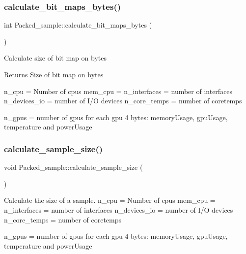 \subsubsection{\texorpdfstring{calculate\+\_\+bit\+\_\+maps\+\_\+bytes()}{calculate\_bit\_maps\_bytes()}}
{\footnotesize\ttfamily int Packed\+\_\+sample\+::calculate\+\_\+bit\+\_\+maps\+\_\+bytes (\begin{DoxyParamCaption}{ }\end{DoxyParamCaption})}

Calculate size of bit map on bytes

\begin{DoxyReturn}{Returns}
Size of bit map on bytes 
\end{DoxyReturn}
n\+\_\+cpu = Number of cpus mem\+\_\+cpu = n\+\_\+interfaces = number of interfaces n\+\_\+devices\+\_\+io = number of I/O devices n\+\_\+core\+\_\+temps = number of coretemps

n\+\_\+gpus = number of gpus for each gpu 4 bytes\+: memory\+Usage, gpu\+Usage, temperature and power\+Usage\mbox{\label{classPacked__sample_a3f941028cbd26a98a99cd3c000b08666}} 
\subsubsection{\texorpdfstring{calculate\+\_\+sample\+\_\+size()}{calculate\_sample\_size()}}
{\footnotesize\ttfamily void Packed\+\_\+sample\+::calculate\+\_\+sample\+\_\+size (\begin{DoxyParamCaption}{ }\end{DoxyParamCaption})}

Calculate the size of a sample. n\+\_\+cpu = Number of cpus mem\+\_\+cpu = n\+\_\+interfaces = number of interfaces n\+\_\+devices\+\_\+io = number of I/O devices n\+\_\+core\+\_\+temps = number of coretemps

n\+\_\+gpus = number of gpus for each gpu 4 bytes\+: memory\+Usage, gpu\+Usage, temperature and power\+Usage\mbox{\label{classPacked__sample_aee75395c481cd25d8a46b5bc2f9b1b8d}} 
